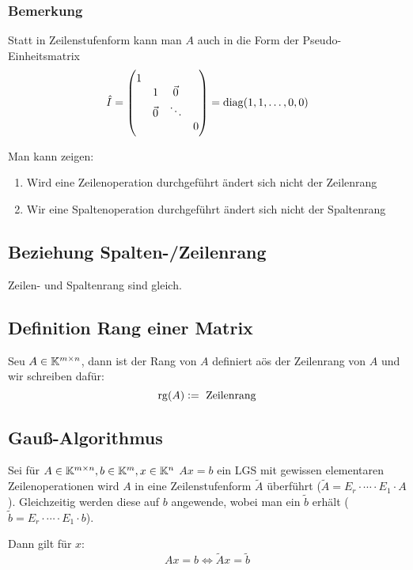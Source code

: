 \subsubsection{Bemerkung}
Statt in Zeilenstufenform kann man $A$ auch in die Form der Pseudo-Einheitsmatrix
\begin{equation*}
    \hat{I} =
    \begin{pmatrix}
        1  \\
        & 1 & \vec{0} &  \\
        & \vec{0} & \ddots \\
        &  & & 0
    \end{pmatrix} = \operatorname{diag}(1, 1, \ldots, 0, 0)
\end{equation*}

Man kann zeigen:
\begin{enumerate}
    \item Wird eine Zeilenoperation durchgeführt ändert sich nicht der
        Zeilenrang
    \item Wir eine Spaltenoperation durchgeführt ändert sich nicht der
        Spaltenrang
\end{enumerate}

\subsection{Beziehung Spalten-/Zeilenrang}
Zeilen- und Spaltenrang sind gleich.

\subsection{Definition Rang einer Matrix}
Seu $A\in\mathbb{K}^{m\times n}$, dann ist der Rang von $A$ definiert aös der Zeilenrang
von $A$ und wir schreiben dafür:
\begin{equation*}
    \operatorname{rg}(A) := \text{ Zeilenrang}
\end{equation*}

\subsection{Gauß-Algorithmus}
Sei für $A \in \mathbb{K}^{m \times n}, b\in\mathbb{K}^m, x\in\mathbb{K}^n$ $Ax=b$ ein LGS mit gewissen
elementaren Zeilenoperationen wird $A$ in eine Zeilenstufenform $\tilde{A}$
überführt ($\tilde{A} = E_r \cdot \cdots \cdot E_1 \cdot A$). Gleichzeitig werden
diese auf $b$ angewende, wobei man ein $\tilde{b}$ erhält ($\tilde{b} = E_r \cdot
\cdots \cdot E_1 \cdot b$).

Dann gilt für $x$:
\begin{equation*}
    Ax = b \Leftrightarrow \tilde{A}x = \tilde{b}
\end{equation*}

